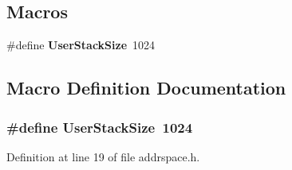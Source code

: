 \subsection*{Macros}
\begin{DoxyCompactItemize}
\item 
\#define {\bf User\+Stack\+Size}~1024
\end{DoxyCompactItemize}


\subsection{Macro Definition Documentation}
\subsubsection[{User\+Stack\+Size}]{\setlength{\rightskip}{0pt plus 5cm}\#define User\+Stack\+Size~1024}\label{addrspace_8h_a7f75893a4e3fe202253c015a4b75a1cc}


Definition at line 19 of file addrspace.\+h.

